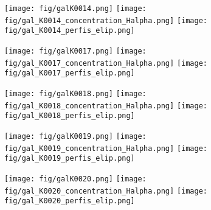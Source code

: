 \begin{figure}[!ht]
\begin{center}
\setcaptionmargin{1cm}
\texttt{[image: fig/galK0014.png]}
\texttt{[image: fig/gal\_K0014\_concentration\_Halpha.png]}
\texttt{[image: fig/gal\_K0014\_perfis\_elip.png]}
\end{center}
\end{figure}


\begin{figure}[!ht]
\begin{center}
\setcaptionmargin{1cm}
\texttt{[image: fig/galK0017.png]}
\texttt{[image: fig/gal\_K0017\_concentration\_Halpha.png]}
\texttt{[image: fig/gal\_K0017\_perfis\_elip.png]}
\end{center}
\end{figure}


\begin{figure}[!ht]
\begin{center}
\setcaptionmargin{1cm}
\texttt{[image: fig/galK0018.png]}
\texttt{[image: fig/gal\_K0018\_concentration\_Halpha.png]}
\texttt{[image: fig/gal\_K0018\_perfis\_elip.png]}
\end{center}
\end{figure}


\begin{figure}[!ht]
\begin{center}
\setcaptionmargin{1cm}
\texttt{[image: fig/galK0019.png]}
\texttt{[image: fig/gal\_K0019\_concentration\_Halpha.png]}
\texttt{[image: fig/gal\_K0019\_perfis\_elip.png]}
\end{center}
\end{figure}


\begin{figure}[!ht]
\begin{center}
\setcaptionmargin{1cm}
\texttt{[image: fig/galK0020.png]}
\texttt{[image: fig/gal\_K0020\_concentration\_Halpha.png]}
\texttt{[image: fig/gal\_K0020\_perfis\_elip.png]}
\end{center}
\end{figure}


